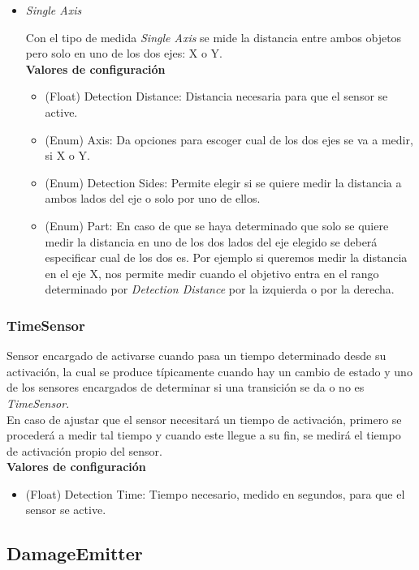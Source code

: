 \begin{itemize}
	\item \textit{Single Axis}

Con el tipo de medida \textit{Single Axis} se mide la distancia entre ambos objetos pero solo en uno de los dos ejes: X o Y.\\

	\textbf{Valores de configuración}
	\begin{itemize}
	        \item (Float) Detection Distance: Distancia necesaria para que el sensor se active.
	        \item (Enum) Axis: Da opciones para escoger cual de los dos ejes se va a medir, si X o Y.
	        \item (Enum) Detection Sides: Permite elegir si se quiere medir la distancia a ambos lados del eje o solo por uno de ellos. 
	        \item (Enum) Part: En caso de que se haya determinado que solo se quiere medir la distancia en uno de los dos lados del eje elegido se deberá especificar cual de los dos es. Por ejemplo si queremos medir la distancia en el eje X, nos permite medir cuando el objetivo entra en el rango determinado por \textit{Detection Distance} por la izquierda o por la derecha.
	 \end{itemize}
\end{itemize}


\subsubsection{TimeSensor}

Sensor encargado de activarse cuando pasa un tiempo determinado desde su activación, la cual se produce típicamente cuando hay un cambio de estado y uno de los sensores encargados de determinar si una transición se da o no es \textit{TimeSensor}.\\
En caso de ajustar que el sensor necesitará un tiempo de activación, primero se procederá a medir tal tiempo y cuando este llegue a su fin, se medirá el tiempo de activación propio del sensor.\\

\textbf{Valores de configuración}
	\begin{itemize}
	        \item (Float) Detection Time: Tiempo necesario, medido en segundos, para que el sensor se active.
	 \end{itemize}

\subsection{DamageEmitter}

